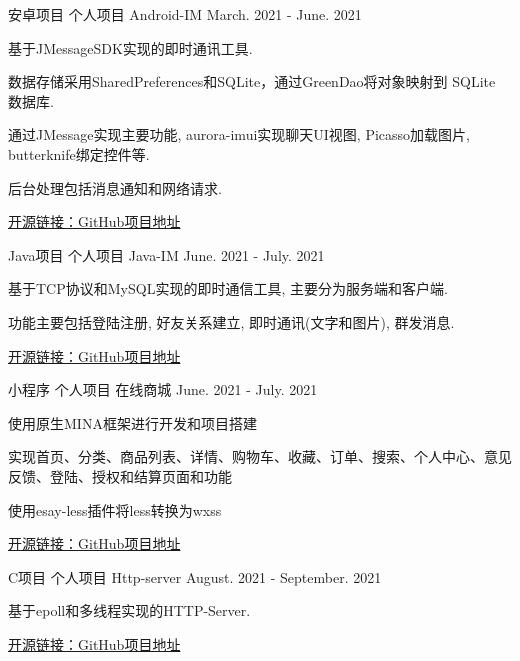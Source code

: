 \begin{cventries}
\cventry
    {安卓项目} %
    {个人项目} %
    {Android-IM} %
    {March. 2021 - June. 2021} %
    {
      \begin{cvitems} %
        \item {基于JMessageSDK实现的即时通讯工具.}
        \item {数据存储采用SharedPreferences和SQLite，通过GreenDao将对象映射到 SQLite 数据库.}
        \item {通过JMessage实现主要功能, aurora-imui实现聊天UI视图, Picasso加载图片, butterknife绑定控件等.}
        \item {后台处理包括消息通知和网络请求.}
        \item {\href{https://github.com/zhoudexi/Android-IM}{开源链接：GitHub项目地址}}
      \end{cvitems}
    }
  \cventry
    {Java项目} %
    {个人项目} %
    {Java-IM} %
    {June. 2021 - July. 2021} %
    {
      \begin{cvitems} %
        \item {基于TCP协议和MySQL实现的即时通信工具, 主要分为服务端和客户端.}
        \item {功能主要包括登陆注册, 好友关系建立, 即时通讯(文字和图片), 群发消息.}
        \item {\href{https://github.com/zhoudexi/Java-IM}{开源链接：GitHub项目地址}}
      \end{cvitems}
    }

  \cventry
    {小程序} %
    {个人项目} %
    {在线商城} %
    {June. 2021 - July. 2021} %
    {
      \begin{cvitems} %
        \item {使用原生MINA框架进行开发和项目搭建}
        \item {实现首页、分类、商品列表、详情、购物车、收藏、订单、搜索、个人中心、意见反馈、登陆、授权和结算页面和功能} 
        \item {使用esay-less插件将less转换为wxss}
        \item {\href{https://github.com/zhoudexi/Mini-Programs-Store}{开源链接：GitHub项目地址}}
      \end{cvitems}
    }
  \cventry
    {C项目} %
    {个人项目} %
    {Http-server} %
    {August. 2021 - September. 2021} %
    {
      \begin{cvitems} %
        \item {基于epoll和多线程实现的HTTP-Server.}
        \item {\href{https://github.com/zhoudexi/httpd}{开源链接：GitHub项目地址}}
      \end{cvitems}
    }


\end{cventries}
